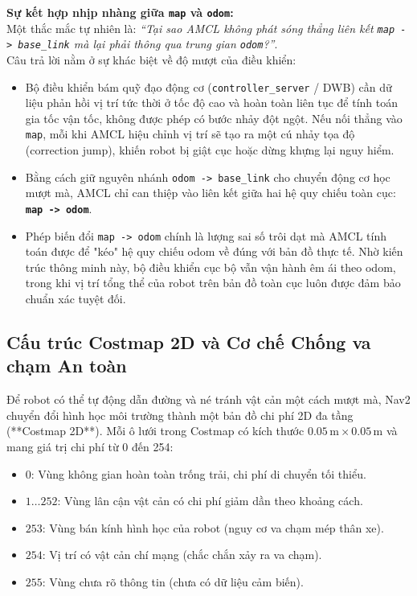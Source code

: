 \documentclass[12pt, a4paper]{article}
\begin{document}
\textbf{Sự kết hợp nhịp nhàng giữa \texttt{map} và \texttt{odom}:}\\
Một thắc mắc tự nhiên là: \textit{“Tại sao AMCL không phát sóng thẳng liên kết \texttt{map -> base\_link} mà lại phải thông qua trung gian \texttt{odom}?”}.\\
Câu trả lời nằm ở sự khác biệt về độ mượt của điều khiển:
\begin{itemize}
    \item Bộ điều khiển bám quỹ đạo động cơ (\texttt{controller\_server} / DWB) cần dữ liệu phản hồi vị trí tức thời ở tốc độ cao và hoàn toàn liên tục để tính toán gia tốc vận tốc, không được phép có bước nhảy đột ngột. Nếu nối thẳng vào \texttt{map}, mỗi khi AMCL hiệu chỉnh vị trí sẽ tạo ra một cú nhảy tọa độ (correction jump), khiến robot bị giật cục hoặc dừng khựng lại nguy hiểm.
    \item Bằng cách giữ nguyên nhánh \texttt{odom -> base\_link} cho chuyển động cơ học mượt mà, AMCL chỉ can thiệp vào liên kết giữa hai hệ quy chiếu toàn cục: \textbf{\texttt{map -> odom}}.
    \item Phép biến đổi \texttt{map -> odom} chính là lượng sai số trôi dạt mà AMCL tính toán được để "kéo" hệ quy chiếu odom về đúng với bản đồ thực tế. Nhờ kiến trúc thông minh này, bộ điều khiển cục bộ vẫn vận hành êm ái theo odom, trong khi vị trí tổng thể của robot trên bản đồ toàn cục luôn được đảm bảo chuẩn xác tuyệt đối.
\end{itemize}

\subsection{Cấu trúc Costmap 2D và Cơ chế Chống va chạm An toàn}
Để robot có thể tự động dẫn đường và né tránh vật cản một cách mượt mà, Nav2 chuyển đổi hình học môi trường thành một bản đồ chi phí 2D đa tầng (**Costmap 2D**). Mỗi ô lưới trong Costmap có kích thước $0.05\,\text{m} \times 0.05\,\text{m}$ và mang giá trị chi phí từ 0 đến 254:
\begin{itemize}
    \item $0$: Vùng không gian hoàn toàn trống trải, chi phí di chuyển tối thiểu.
    \item $1 \dots 252$: Vùng lân cận vật cản có chi phí giảm dần theo khoảng cách.
    \item $253$: Vùng bán kính hình học của robot (nguy cơ va chạm mép thân xe).
    \item $254$: Vị trí có vật cản chí mạng (chắc chắn xảy ra va chạm).
    \item $255$: Vùng chưa rõ thông tin (chưa có dữ liệu cảm biến).
\end{itemize}
\end{document}
